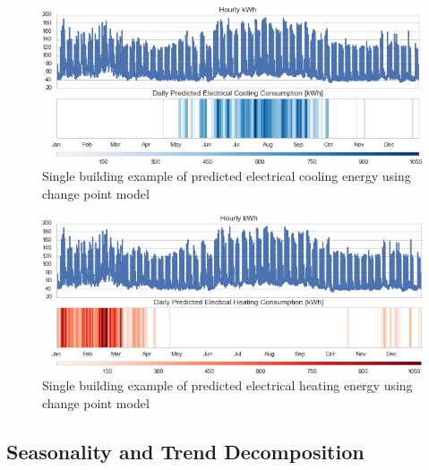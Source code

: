 \begin{figure}[ht!]
\begin{center}
\includegraphics[width=1\columnwidth]{figures/cooling_example/cooling_example}
\caption{Single building example of predicted electrical cooling energy using change point model
\label{fig:cooling_single}%
}
\end{center}
\end{figure}

\begin{figure}[ht!]
\begin{center}
\includegraphics[width=1\columnwidth]{figures/heating_example/heating_example}
\caption{Single building example of predicted electrical heating energy using change point model
\label{fig:heating_single}%
}
\end{center}
\end{figure}

\subsection{Seasonality and Trend Decomposition}
\label{sec:seasonaldecomposition}

